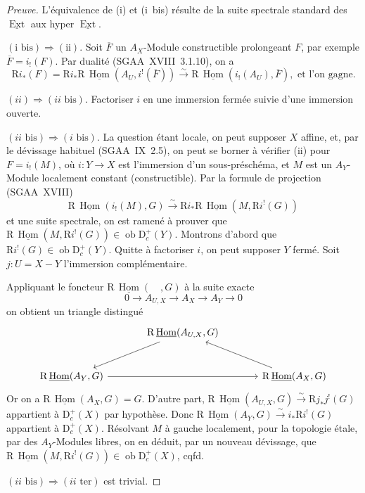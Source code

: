 \documentclass[11pt]{article}
\DeclareMathOperator{\Hom}{Hom}
\DeclareMathOperator{\Ext}{Ext}
\newcommand{\R}{\mathrm{R}}
\newcommand{\D}{\mathrm{D}}
\newcommand{\ob}{\operatorname{ob}}
\newcommand{\ol}[1]{\overline{#1}}
\providecommand{\Hom}{\operatorname{Hom}}
\providecommand{\ob}{\operatorname{ob}}
\providecommand{\R}{\mathrm R}
\providecommand{\Hom}{\operatorname{Hom}}
\begin{document}
\begin{proof}[Preuve]
L'équivalence de (i) et (i~bis) résulte de la suite spectrale standard des $\underline{\Ext}$ aux hyper $\underline{\Ext}$.

$(\text{i~bis}) \Rightarrow (\text{ii})$. Soit $\ol{F}$ un $A_X$-Module constructible prolongeant $F$, par exemple $\ol{F} = i_{!}(F)$. Par dualité (SGAA~XVIII~3.1.10), on a
\[
\R i_{*}(F) = \R i_{*} \R\,\underline{\Hom}(A_U, i^{!}(\ol{F})) \xrightarrow{\sim} \R\,\underline{\Hom}(i_{!}(A_U), \ol{F}), \text{ et l'on gagne.}
\]

$(ii) \Rightarrow (ii\text{~bis})$. Factoriser $i$ en une immersion fermée suivie d'une immersion ouverte.

$(ii\text{~bis}) \Rightarrow (i\text{~bis})$. La question étant locale, on peut supposer $X$ affine, et, par le dévissage habituel (SGAA~IX~2.5), on peut se borner à vérifier (ii) pour $F = i_{!}(M)$, où $i : Y \to X$ est l'immersion d'un sous-préschéma, et $M$ est un $A_Y$-Module localement constant (constructible). Par la formule de projection (SGAA~XVIII)
\[
\R\,\underline{\Hom}(i_{!}(M), G) \xrightarrow{\sim} \R i_{*} \R\,\underline{\Hom}(M, \R i^{!}(G))
\]
et une suite spectrale, on est ramené à prouver que $\R\,\underline{\Hom}(M, \R i^{!}(G)) \in \ob \D_c^{+}(Y)$. Montrons d'abord que $\R i^{!}(G) \in \ob \D_c^{+}(Y)$. Quitte à factoriser $i$, on peut supposer $Y$ fermé. Soit $j : U = X - Y$ l'immersion complémentaire.

Appliquant le foncteur $\R\,\underline{\Hom}(\quad, G)$ à la suite exacte
\[
0 \longrightarrow A_{U,X} \longrightarrow A_X \longrightarrow A_Y \longrightarrow 0
\]
on obtient un triangle distingué
\[
\begin{tikzcd}[column sep=large,row sep=large]
& \R\,\underline{\Hom}(A_{U,X}, G) \arrow[dl] & \\
\R\,\underline{\Hom}(A_Y, G) \arrow[rr] & & \R\,\underline{\Hom}(A_X, G) \arrow[ul]
\end{tikzcd}
\]
Or on a $\R\,\underline{\Hom}(A_X, G) = G$. D'autre part, $\R\,\underline{\Hom}(A_{U,X}, G) \xrightarrow{\sim} \R j_{*} j^{!}(G)$ appartient à $\D_c^{+}(X)$ par hypothèse. Donc $\R\,\underline{\Hom}(A_Y, G) \xrightarrow{\sim} i_{*} \R i^{!}(G)$ appartient à $\D_c^{+}(X)$. Résolvant $M$ à gauche localement, pour la topologie étale, par des $A_Y$-Modules libres, on en déduit, par un nouveau dévissage, que $\R\,\underline{\Hom}(M, \R i^{!}(G)) \in \ob \D_c^{+}(X)$, cqfd.

$(ii\text{~bis}) \Rightarrow (ii\text{~ter})$ est trivial.


\end{proof}
\end{document}
